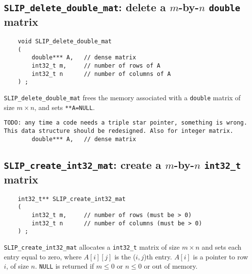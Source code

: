 \documentclass[12pt]{article}
\theoremstyle{definition}
\begin{document}
\cprotect\subsection{\verb|SLIP_delete_double_mat|: delete a $m$-by-$n$ \verb|double| matrix}

\begin{mdframed}[userdefinedwidth=6in]
{\footnotesize
\begin{verbatim}
    void SLIP_delete_double_mat
    (
        double*** A,   // dense matrix
        int32_t m,     // number of rows of A
        int32_t n      // number of columns of A
    ) ;
\end{verbatim}
} \end{mdframed}

\verb|SLIP_delete_double_mat| frees the memory associated with a \verb|double|
matrix of size $m \times n$, and sets \verb|**A=NULL|.


\begin{verbatim}
TODO: any time a code needs a triple star pointer, something is wrong.
This data structure should be redesigned. Also for integer matrix.
        double*** A,   // dense matrix
\end{verbatim}

\cprotect\subsection{\verb|SLIP_create_int32_mat|: create a $m$-by-$n$ \verb|int32_t| matrix}

\begin{mdframed}[userdefinedwidth=6in]
{\footnotesize
\begin{verbatim}
    int32_t** SLIP_create_int32_mat
    (
        int32_t m,     // number of rows (must be > 0)
        int32_t n      // number of columns (must be > 0)
    ) ;
\end{verbatim}
} \end{mdframed}

\verb|SLIP_create_int32_mat| allocates a \verb|int32_t| matrix of size $m \times
n$ and sets each entry equal to zero, where $A[i][j]$ is the ($i,j$)th entry.
$A[i]$ is a pointer to row $i$, of size $n$. \verb|NULL| is returned if
$m \le 0 $ or $n\le 0$ or out of memory.
\end{document}
